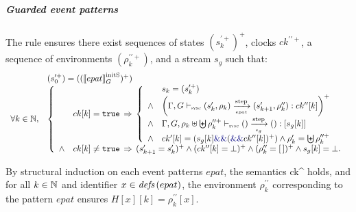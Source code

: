 \begin{skippableproof}
    \subparagraph{Guarded event patterns}
    The rule  ensures there exist sequences of
    states $(s_k^{\prime+})^+$, clocks $ck^{\prime\prime+}$, a sequence of environments
    $(\rho_k^{\prime\prime+})$, and a stream $s_g$ such that:
    \begin{equation*}
        \begin{array}{ll}
                              & (s_0^{\prime+}) = ((\initstate{epat})^+) \\
            \forall k \in \N, &
            \left\{
            \begin{array}{ll}
                       & ck[k] = \true \, \Rightarrow \,
                \left\{
                \begin{array}{ll}
                           & s_k = (s_k^{\prime+})                                                                                                  \\
                    \wedge & \left(\epatOpsem{\rho_k}{s'_k}{epat}{s'_{k+1}}{ck^{\prime\prime}[k]}{\rho^{\prime\prime}_k}\right)^+                   \\
                    \wedge & \exprOpsem{\rho_k \ctxconcat \bigCtxconcat \rho^{\prime\prime+}_k}{()}{e_g}{()}{s_g[k]}                                \\
                    \wedge & ck'[k] = (s_g[k] \kwf{\&\&} (\kwf{\&\&} ck^{\prime\prime}[k])^+) \wedge \rho'_k = \bigCtxconcat \rho^{\prime\prime+}_k \\
                \end{array}
                \right.                                                     \\
                \wedge & ck[k] \neq \true \, \Rightarrow \,
                (s'_{k+1} = s'_k)^+ \wedge (ck^{\prime\prime}[k] = \bot)^+ \wedge
                (\rho^{\prime\prime}_k = \emptyrho)^+ \wedge s_g[k] = \bot. \\
            \end{array}
            \right.
        \end{array}
    \end{equation*}

    By structural induction on each event patterns $epat$, the semantics 
    {ck^{\prime\prime}} holds, and for all $k \in \mathbb{N}$ and identifier $x \in {\ensuremath{\textit{defs}\left(epat\right)}}$,
    the environment $\rho^{\prime\prime}_k$ corresponding to the pattern $epat$ ensures $H[x][k] =
        \rho^{\prime\prime}_k[x]$.


\end{skippableproof}
